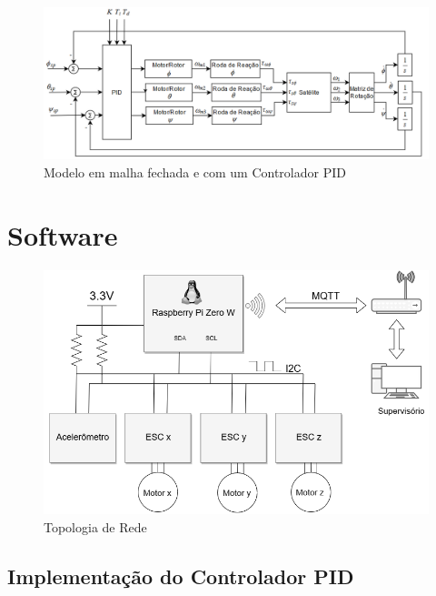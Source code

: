 \begin{figure}[H]
  \caption{Modelo em malha fechada e com um Controlador PID}
  \begin{center}
      \includegraphics[scale=.55]{img/modelo_satelite_pid}
  \end{center}
  \label{fig:modelo_satelite_pid}
\end{figure}


\section{Software}

\begin{figure}[H]
  \caption{Topologia de Rede}
  \begin{center}
      \includegraphics[scale=.75]{img/comunicacao_projeto}
  \end{center}
  \label{fig:comunicacao_projeto}
\end{figure}

\subsection{Implementação do Controlador PID}

